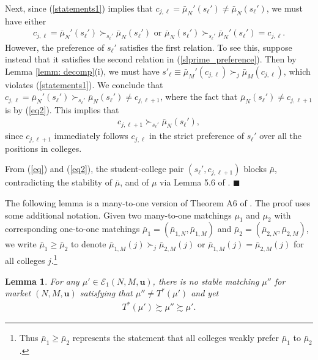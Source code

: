 \documentclass[12pt, fullpage]{amsart}
\newtheorem{lemma}{Lemma}[section]
\theoremstyle{definition}
\theoremstyle{definition}
\theoremstyle{definition}
\begin{document}
\begin{bibunit}[econometrica]
Next, since (\ref{statements1}) implies that $c_{j,\ell}=\bar \mu_{N}'(s_\ell')\ne \bar \mu_{N}(s_\ell')$, we must have either 
\begin{align}\label{slprime_preference}
c_{j,\ell} = \bar{\mu}_{N}'(s_{\ell}') \succ_{s_{\ell}'}\bar{\mu}_{N}(s_{\ell}')\text{ or }\bar{\mu}_{N}(s_{\ell}') \succ_{s_{\ell}'}\bar{\mu}_{N}'(s_{\ell}')= 	c_{j,\ell}.
\end{align}
However, the preference of $s_{\ell}'$ satisfies the first relation. To see this, suppose instead that it satisfies the second relation in (\ref{slprime_preference}). Then by Lemma \ref{lemm: decomp}(i), we must have $s'_{\ell}\equiv \bar \mu_M'(c_{j,\ell}) \succ_j \bar \mu_M(c_{j,\ell})$, which violates (\ref{statements1}).  We conclude that $c_{j,\ell}=\bar{\mu}_{N}'(s_{\ell}') \succ_{s_{\ell}'}\bar{\mu}_{N}(s_{\ell}')\ne c_{j,\ell+1}$, where the fact that $\bar{\mu}_{N}(s_{\ell}')\ne c_{j,\ell+1}$ is by (\ref{eq2}). This implies that
\begin{align}
	\label{eq}
	c_{j,\ell+1}\succ_{s_{\ell}'} \bar{\mu}_{N}(s_{\ell}'),
\end{align}
since $c_{j,\ell+1}$ immediately follows $c_{j,\ell}$ in the strict preference of $s_{\ell}'$ over all the positions in colleges.

From (\ref{eq}) and (\ref{eq2}), the student-college pair $(s_{\ell}',c_{j,\ell+1})$ blocks $\bar{\mu}$, contradicting the
stability of $\bar \mu$, and of $\mu$ via Lemma 5.6 of \citet{Roth/Sotomayor:90:TwoSidedMatching}. $\blacksquare$\medskip

The following lemma is a many-to-one version of Theorem A6 of \citet{Blum/Rothblum/2002}. The proof uses some additional notation. Given two many-to-one matchings $\mu_{1}$ and $\mu_{2}$ with  corresponding one-to-one matchings $\bar \mu_{1}=(\bar{\mu}_{1,N},\bar{\mu}_{1,M})$ and $\bar \mu_{2}=(\bar{\mu}_{2,N},\bar{\mu}_{2,M})$,   we write  $\bar{\mu}_{1}\geq\bar{\mu}_{2}$ to denote $\bar{\mu}_{1,M}(j)\succ_{j}\bar{\mu}_{2,M}(j)$ or $\bar{\mu}_{1,M}(j)=\bar{\mu}_{2,M}(j)$ for all colleges $j$.\footnote{Thus $\bar{\mu}_{1}\geq\bar{\mu}_{2}$ represents the statement that all colleges weakly prefer $\bar{\mu}_{1}$ to $\bar{\mu}_{2}$.}


\begin{lemma}\label{lem:thmA6BRR} For any $\mu' \in\mathcal{E}_1(N,M,\boldsymbol{u})$, there is no stable matching $\mu''$ for market $(N,M,\boldsymbol{u})$ satisfying that $\mu''\ne T^{*}(\mu')$ and yet 
	\begin{align}
		T^{*}(\mu') \succsim \mu''\succsim  \mu'.
	\end{align}
\end{lemma}


\end{bibunit}
\end{document}
